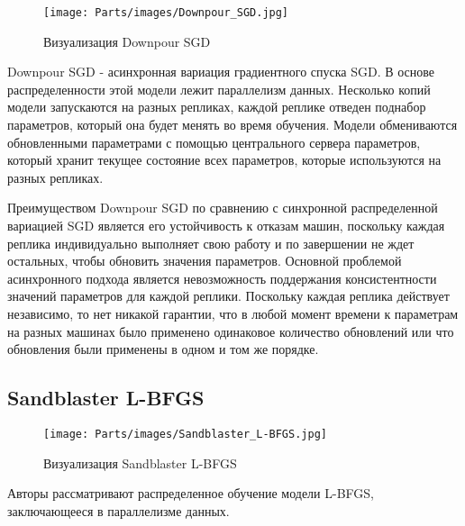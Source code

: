 \begin{wrapfigure}[8]{r}{0.4\textwidth}
	\vspace{-2cm}
	\begin{center}
		\texttt{[image: Parts/images/Downpour\_SGD.jpg]}
	\end{center}
	\caption{Визуализация Downpour SGD}
\end{wrapfigure}

Downpour SGD - асинхронная вариация градиентного спуска SGD. В основе распределенности этой модели лежит параллелизм данных. Несколько копий модели запускаются на разных репликах, каждой реплике отведен поднабор параметров, который она будет менять во время обучения. Модели обмениваются обновленными параметрами с помощью центрального сервера параметров, который хранит текущее состояние всех параметров, которые используются на разных репликах.


Преимуществом Downpour SGD по сравнению с синхронной распределенной вариацией SGD является его устойчивость к отказам машин, поскольку каждая реплика индивидуально выполняет свою работу и по завершении не ждет остальных, чтобы обновить значения параметров. Основной проблемой асинхронного подхода является невозможность поддержания консистентности значений параметров для каждой реплики. Поскольку каждая реплика действует независимо, то нет никакой гарантии, что в любой момент времени к параметрам на разных машинах было применено одинаковое количество обновлений или что обновления были применены в одном и том же порядке.

\subsection{Sandblaster L-BFGS}
\begin{wrapfigure}[14]{r}{0.5\textwidth}
	\begin{center}
		\texttt{[image: Parts/images/Sandblaster\_L-BFGS.jpg]}
	\end{center}
	\caption{Визуализация Sandblaster L-BFGS}
\end{wrapfigure}

Авторы рассматривают распределенное обучение модели L-BFGS, заключающееся в параллелизме данных.  

